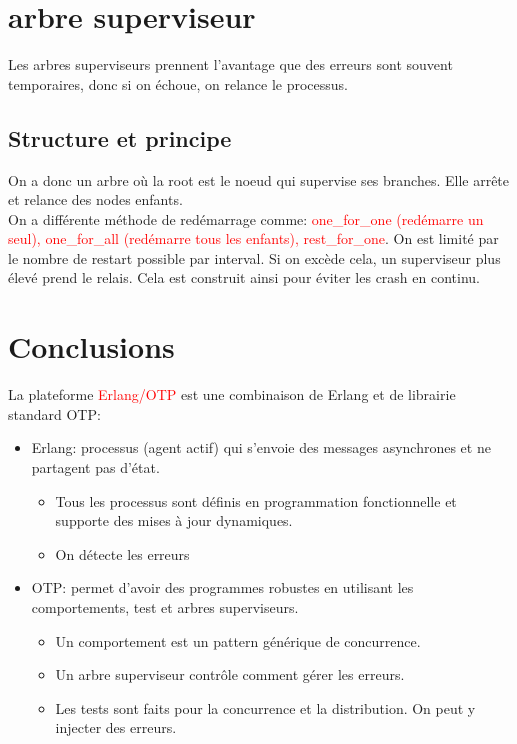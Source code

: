 \documentclass{report}
\begin{document}
\section{arbre superviseur}
Les arbres superviseurs prennent l'avantage que des erreurs sont souvent temporaires, donc si on échoue, on relance le processus.

\subsection{Structure et principe}
On a donc un arbre où la root est le noeud qui supervise ses branches. Elle arrête et relance des nodes enfants.\\
On a différente méthode de redémarrage comme: \textcolor{red}{one\_for\_one (redémarre un seul), one\_for\_all (redémarre tous les enfants), rest\_for\_one}. On est limité par le nombre de restart possible par interval. Si on excède cela, un superviseur plus élevé prend le relais. Cela est construit ainsi pour éviter les crash en continu.

\section{Conclusions}
La plateforme \textcolor{red}{Erlang/OTP} est une combinaison de Erlang et de librairie standard OTP:
\begin{itemize}
\item Erlang: processus (agent actif) qui s'envoie des messages asynchrones et ne partagent pas d'état.
	\begin{itemize}
	\item Tous les processus sont définis en programmation fonctionnelle et supporte des mises à jour dynamiques.
	\item On détecte les erreurs
	\end{itemize}
\item OTP: permet d'avoir des programmes robustes en utilisant les comportements, test et arbres superviseurs.
	\begin{itemize}
	\item Un comportement est un pattern générique de concurrence. 
	\item Un arbre superviseur contrôle comment gérer les erreurs.
	\item Les tests sont faits pour la concurrence et la distribution. On peut y injecter des erreurs.
	\end{itemize}
\end{itemize}
\end{document}
